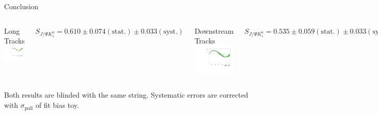 \documentclass{beamer}
\newcommand{\SJPsi}{S_{J/\Psi K_s^0}}
\begin{document}
\begin{frame}{Conclusion}
	\begin{columns}
	\begin{block}{Long Tracks}
	\centering
	\includegraphics[width=\textwidth]{asymmetry_lt}	
	\end{block}
	$\SJPsi = 0.610 \pm 0.074 (\text{stat.}) \pm 0.033 (\text{syst.})$
	\begin{block}{Downstream Tracks}
	\centering
	\includegraphics[width=\textwidth]{asymmetry_ds}
	\end{block}
	$\SJPsi = 0.535 \pm 0.059 (\text{stat.}) \pm 0.033 (\text{syst.})$
	\end{columns}
    \begin{center}
    Both results are blinded with the same string. Systematic errors are corrected with $\sigma_{\text{pull}}$ of fit bias toy.
    \end{center}
\end{frame}
\end{document}
